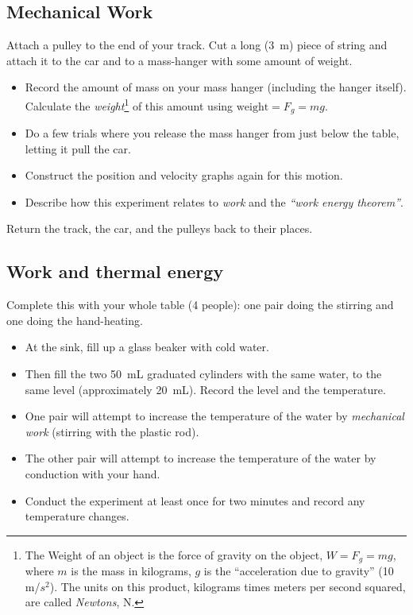 \subsection{Mechanical Work}

Attach a pulley to the end of your track. Cut a long (3~m) piece of string and attach it to the car and to a mass-hanger with some amount of weight.
	\begin{itemize}
	\item Record the amount of mass on your mass hanger (including the hanger itself).  Calculate the {\em weight}\footnote{The Weight of an object is the force of gravity on the object, $W = F_g = m g$, where $m$ is the mass in kilograms, $g$ is the ``acceleration due to gravity'' (10 m/$s^2$). The units on this product, kilograms times meters per second squared, are called {\em Newtons}, N.} of this amount using $\text{weight} = F_g = mg$.
	\item Do a few trials where you release the mass hanger from just below the table, letting it pull the car.
	\item Construct the position and velocity graphs again for this motion.
	\item Describe how this experiment relates to {\em work} and the {\em ``work energy theorem''}.
	\end{itemize}
Return the track, the car, and the pulleys back to their places.

\subsection{Work and thermal energy}

Complete this with your whole table (4 people): one pair doing the stirring and one doing the hand-heating.
	\begin{itemize}
	\item At the sink, fill up a glass beaker with cold water.  
	\item Then fill the two 50~mL graduated cylinders with the same water, to the same level (approximately 20~mL).  Record the level and the temperature.
	\item One pair will attempt to increase the temperature of the water by {\em mechanical work} (stirring with the plastic rod).
	\item The other pair will attempt to increase the temperature of the water by conduction with your hand.
	\item Conduct the experiment at least once for two minutes and record any temperature changes.
	\end{itemize}

